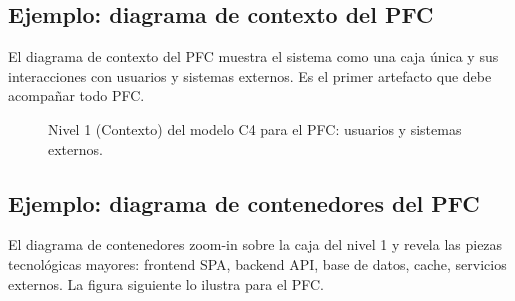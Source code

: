 \subsection{Ejemplo: diagrama de contexto del PFC}

El diagrama de contexto del PFC muestra el sistema como una
caja única y sus interacciones con usuarios y sistemas externos. Es
el primer artefacto que debe acompañar todo PFC.


\begin{figure}[htbp]
\centering
{}
\caption{Nivel 1 (Contexto) del modelo C4 para el PFC: usuarios y
sistemas externos.}
\end{figure}

\subsection{Ejemplo: diagrama de contenedores del PFC}

El diagrama de contenedores zoom-in sobre la caja del nivel
1 y revela las piezas tecnológicas mayores: frontend SPA, backend
API, base de datos, cache, servicios externos. La figura siguiente
lo ilustra para el PFC.


